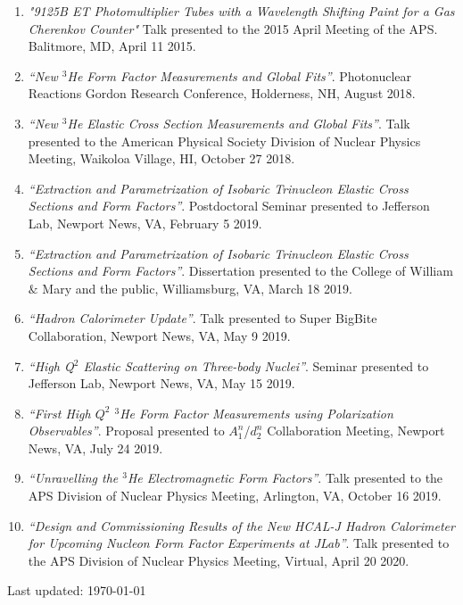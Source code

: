 \documentclass[letterpaper,10pt]{article}
\def\footerlink{}
\begin{document}
{\begin{enumerate}
		\item \textit{"9125B ET Photomultiplier Tubes with a Wavelength Shifting Paint for a Gas Cherenkov Counter"} Talk presented to the 2015 April Meeting of the APS. Balitmore, MD, April 11 2015. 
		
		\item \textit{``New $^3$He Form Factor Measurements and Global Fits''}. Photonuclear Reactions Gordon Research Conference, Holderness, NH, August 2018.
		
		\item \textit{``New $^3$He Elastic Cross Section Measurements and Global Fits''}. Talk presented to the American Physical Society Division of Nuclear Physics Meeting, Waikoloa Village, HI, October 27 2018.
		
		\item \textit{``Extraction and Parametrization of Isobaric Trinucleon Elastic Cross Sections and Form Factors''}. Postdoctoral Seminar presented to Jefferson Lab, Newport News, VA, February 5 2019.
		
		\item \textit{``Extraction and Parametrization of Isobaric Trinucleon Elastic Cross Sections and Form Factors''}. Dissertation presented to the College of William $\&$ Mary and the public, Williamsburg, VA, March 18 2019.
		
		\item \textit{``Hadron Calorimeter Update''}. Talk presented to Super BigBite Collaboration, Newport News, VA, May 9 2019.
		
		\item \textit{``High Q$^2$ Elastic Scattering on Three-body Nuclei''}. Seminar presented to Jefferson Lab, Newport News, VA, May 15 2019.
		
		\item \textit{``First High $Q^2$ $^3$He Form Factor Measurements using Polarization Observables''}. Proposal presented to $A_1^n$/$d_2^n$ Collaboration Meeting, Newport News, VA, July 24 2019.
		
		\item \textit{``Unravelling the $^3$He Electromagnetic Form Factors''}. Talk presented to the APS Division of Nuclear Physics Meeting, Arlington, VA, October 16 2019.
		
		\item \textit{``Design and Commissioning Results of the New HCAL-J Hadron Calorimeter for Upcoming Nucleon Form Factor Experiments at JLab''}. Talk presented to the APS Division of Nuclear Physics Meeting, Virtual, April 20 2020.
	
	\end{enumerate}


\bigskip
\begin{center}
  \begin{footnotesize}
    Last updated: \today \\
    \href{\footerlink}{\texttt{\footerlink}}
  \end{footnotesize}
\end{center}
}
\end{document}
